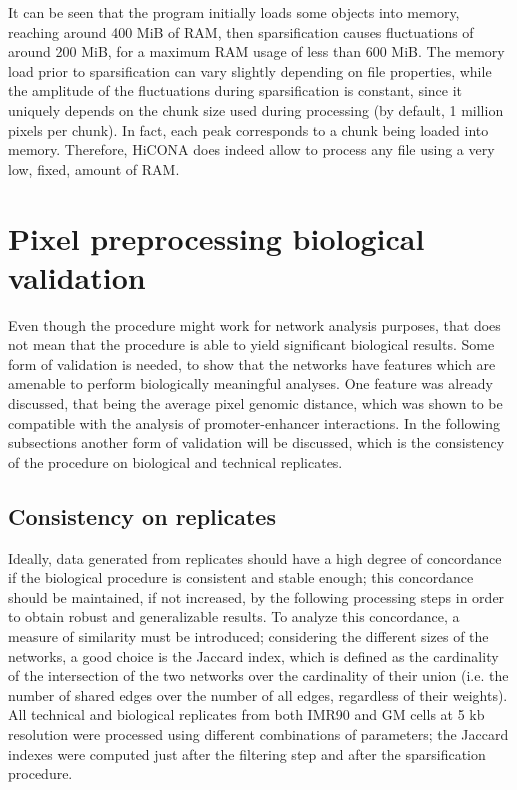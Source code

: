 It can be seen that the program initially loads some objects into memory, reaching around 400 MiB of RAM, then sparsification causes fluctuations of around 200 MiB, for a maximum RAM usage of less than 600 MiB. The memory load prior to sparsification can vary slightly depending on file properties, while the amplitude of the fluctuations during sparsification is constant, since it uniquely depends on the chunk size used during processing (by default, 1 million pixels per chunk). In fact, each peak corresponds to a chunk being loaded into memory. Therefore, HiCONA does indeed allow to process any file using a very low, fixed, amount of RAM.

\section{Pixel preprocessing biological validation}

Even though the procedure might work for network analysis purposes, that does not mean that the procedure is able to yield significant biological results. Some form of validation is needed, to show that the networks have features which are amenable to perform biologically meaningful analyses. One feature was already discussed, that being the average pixel genomic distance, which was shown to be compatible with the analysis of promoter-enhancer interactions. In the following subsections another form of validation will be discussed, which is the consistency of the procedure on biological and technical replicates.

\subsection{Consistency on replicates}

Ideally, data generated from replicates should have a high degree of concordance if the biological procedure is consistent and stable enough; this concordance should be maintained, if not increased, by the following processing steps in order to obtain robust and generalizable results. To analyze this concordance, a measure of similarity must be introduced; considering the different sizes of the networks, a good choice is the Jaccard index, which is defined as the cardinality of the intersection of the two networks over the cardinality of their union (i.e. the number of shared edges over the number of all edges, regardless of their weights). All technical and biological replicates from both IMR90 and GM cells at 5 kb resolution were processed using different combinations of parameters; the Jaccard indexes were computed just after the filtering step and after the sparsification procedure.

